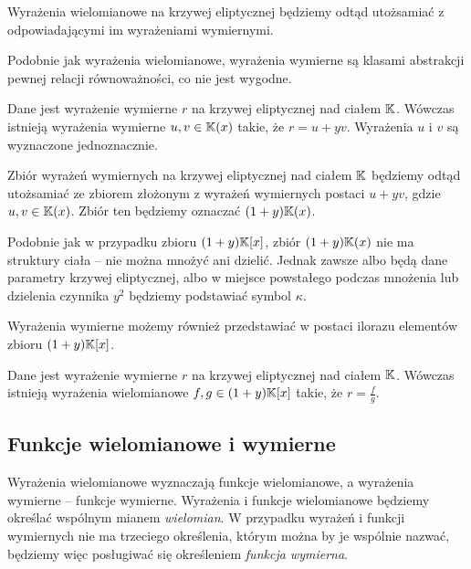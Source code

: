 \begin{remark}
Wyrażenia wielomianowe na krzywej eliptycznej
będziemy odtąd utożsamiać z odpowiadającymi im wyrażeniami wymiernymi.
\end{remark}

\noindent
Podobnie jak wyrażenia wielomianowe,
wyrażenia wymierne są klasami abstrakcji pewnej relacji równoważności,
co nie jest wygodne.

\begin{theorem}
Dane jest wyrażenie wymierne $r$ na krzywej eliptycznej nad ciałem $\mathbb{K}$.
Wówczas istnieją wyrażenia wymierne $u, v \in \mathbb{K}(x)$ takie,
że $r = u + yv$.
Wyrażenia $u$ i $v$ są wyznaczone jednoznacznie.
\end{theorem}

\begin{remark}
Zbiór wyrażeń wymiernych na krzywej eliptycznej nad ciałem $\mathbb{K}$
będziemy odtąd utożsamiać ze zbiorem
złożonym z wyrażeń wymiernych postaci $u + yv$,
gdzie $u,v \in \mathbb{K}(x)$.
Zbiór ten będziemy oznaczać $(1 + y)\mathbb{K}(x)$.
\end{remark}

\noindent
Podobnie jak w przypadku zbioru $(1 + y)\mathbb{K}[x]$,
zbiór $(1 + y)\mathbb{K}(x)$ nie ma struktury ciała --
nie można mnożyć ani dzielić.
Jednak zawsze albo będą dane parametry krzywej eliptycznej,
albo w miejsce powstałego podczas mnożenia lub dzielenia czynnika $y^2$
będziemy podstawiać symbol $\kappa$.

\noindent
Wyrażenia wymierne możemy również przedstawiać w postaci ilorazu
elementów zbioru $(1 + y)\mathbb{K}[x]$.

\begin{theorem}
Dane jest wyrażenie wymierne $r$ na krzywej eliptycznej nad ciałem $\mathbb{K}$.
Wówczas istnieją wyrażenia wielomianowe $f, g \in (1 + y)\mathbb{K}[x]$ takie,
że $r = \frac{f}{g}$.
\end{theorem}

\subsection*{Funkcje wielomianowe i wymierne}

\noindent
Wyrażenia wielomianowe wyznaczają funkcje wielomianowe,
a wyrażenia wymierne -- funkcje wymierne.
Wyrażenia i funkcje wielomianowe będziemy określać
wspólnym mianem \emph{wielomian}.
W przypadku wyrażeń i funkcji wymiernych nie ma trzeciego określenia,
którym można by je wspólnie nazwać,
będziemy więc posługiwać się określeniem \emph{funkcja wymierna}.


